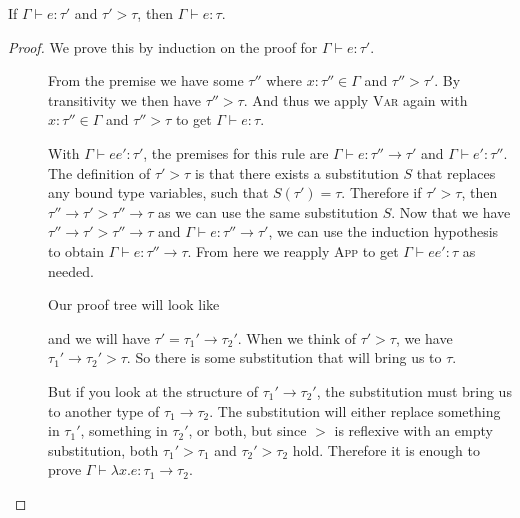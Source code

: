 \begin{lemma}
  If $\Gamma \vdash e : \tau'$ and $\tau' > \tau$, then $\Gamma \vdash e : \tau$.
\end{lemma}
\begin{proof}
  We prove this by induction on the proof for $\Gamma \vdash e : \tau'$.
  \begin{description}
  \item[\textmd{}]
    From the premise we have some $\tau''$ where $x : \tau'' \in \Gamma$ and $\tau'' >
    \tau'$. By transitivity we then have $\tau'' > \tau$. And thus we apply
    \textsc{Var} again with $x : \tau'' \in \Gamma$ and $\tau'' > \tau$ to get $\Gamma
    \vdash e : \tau$. 
  \item[\textmd{}]
    With $\Gamma \vdash e e' : \tau'$, the premises for this rule are $\Gamma \vdash e : \tau'' \rightarrow \tau'$ and $\Gamma \vdash e' :
    \tau''$.
    The definition of $\tau' > \tau$ is that there exists a
    substitution $S$ that replaces any bound type variables, such that
    $S(\tau') = \tau$.
    Therefore if $\tau' > \tau$, then $\tau'' \rightarrow \tau' > \tau'' \rightarrow \tau$ as we can use the
    same substitution $S$. 
    Now that we have $\tau'' \rightarrow \tau' > \tau'' \rightarrow \tau$ and $\Gamma \vdash e : \tau'' \rightarrow
    \tau'$, we can use the induction hypothesis to obtain $\Gamma \vdash e : \tau'' \rightarrow
    \tau$. From here we reapply \textsc{App} to get $\Gamma \vdash e e' : \tau$ as
    needed.
  \item[\textmd{}]
    Our proof tree will look like
    \begin{mathpar}
    \end{mathpar}
    and we will have $\tau' = \tau_1' \rightarrow \tau_2'$. When we think of $\tau' > \tau$, we
    have $\tau_1' \rightarrow \tau_2' > \tau$. So there is some substitution that will
    bring us to $\tau$.

    But if you look at the structure of $\tau_1' \rightarrow \tau_2'$, the
    substitution must bring us to another type of
    $\tau_1 \rightarrow \tau_2$.  The substitution will either replace something in
    $\tau_1'$, something in $\tau_2'$, or both, but since $>$ is reflexive
    with an empty substitution, both $\tau_1' > \tau_1$ and
    $\tau_2' > \tau_2$ hold. Therefore it is enough to prove $\Gamma \vdash \lambda x . e :
    \tau_1 \rightarrow \tau_2$.


\end{description}
\end{proof}
